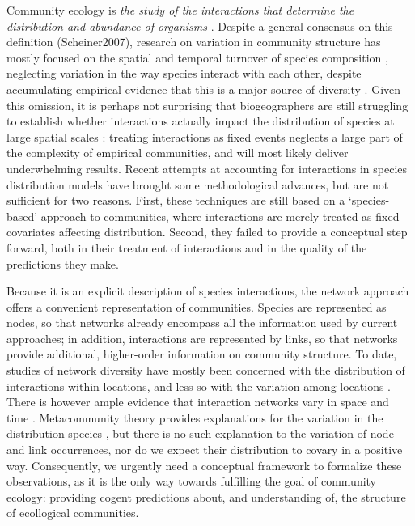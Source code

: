 \documentclass[12pt]{article}
\begin{document}
Community ecology is \textit{the study of the interactions that determine
the distribution and abundance of organisms} \citep{Krebs2001}. Despite a
general consensus on this definition (Scheiner2007), research on variation in
community structure has mostly focused on the spatial and temporal turnover
of species composition \citep{Anderson2011}, neglecting variation in the way
species interact with each other, despite accumulating empirical evidence that
this is a major source of diversity \citep{Poisot2015a}. Given this omission,
it is perhaps not surprising that biogeographers are still struggling to
establish whether interactions actually impact the distribution of species at
large spatial scales \citep{Wisz2012, Kissling2012}: treating interactions
as fixed events neglects a large part of the complexity of empirical
communities, and will most likely deliver underwhelming results. Recent
attempts at accounting for interactions in species distribution models
\citep{Pollock2014, Pelissier2013} have brought some methodological advances,
but are not sufficient for two reasons. First, these techniques are still
based on a `species-based' approach to communities, where interactions
are merely treated as fixed covariates affecting distribution. Second,
they failed to provide a conceptual step forward, both in their treatment
of interactions and in the quality of the predictions they make.

Because it is an explicit description of species interactions, the network
approach offers a convenient representation of communities. Species are
represented as nodes, so that networks already encompass all the information
used by current approaches; in addition, interactions are represented by links,
so that networks provide additional, higher-order information on community
structure. To date, studies of network diversity have mostly been concerned
with the distribution of interactions within locations, and less so with
the variation among locations \citep{Dunne2005, Bascompte2007, Ings2007,
Kefi2012}. There is however ample evidence that interaction networks vary
in space and time \citep{Laliberte2010, Poisot2012, Albouy2014, Poisot2016,
Trojelsgaard2015}. Metacommunity theory provides explanations for the variation
in the distribution species \citep{Gravel2011c, Pillai2011}, but there is
no such explanation to the variation of node and link occurrences, nor do
we expect their distribution to covary in a positive way. Consequently,
we urgently need a conceptual framework to formalize these observations,
as it is the only way towards fulfilling the goal of community ecology:
providing cogent predictions about, and understanding of, the structure of
ecollogical communities.
\end{document}
